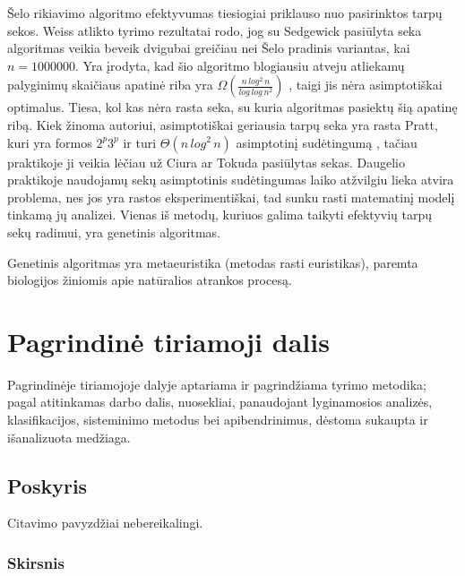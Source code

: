 \documentclass{VUMIFInfKursinis}
\begin{document}
Šelo rikiavimo algoritmo efektyvumas tiesiogiai priklauso nuo pasirinktos tarpų sekos.
Weiss atlikto tyrimo \cite{weiss1991short} rezultatai rodo, jog su Sedgewick pasiūlyta seka
algoritmas veikia beveik dvigubai greičiau nei Šelo pradinis variantas, kai $n = 1000000$.
Yra įrodyta, kad šio algoritmo blogiausiu atveju atliekamų palyginimų skaičiaus apatinė riba yra
$\Omega(\frac{n\,log^2\,n}{log\,log\,n^2})$ \cite{267769}, taigi jis nėra asimptotiškai optimalus.
Tiesa, kol kas nėra rasta seka, su kuria algoritmas pasiektų šią apatinę ribą.
Kiek žinoma autoriui, asimptotiškai geriausia tarpų seka yra rasta Pratt, kuri yra formos
$2^p3^p$ ir turi $\Theta(n\,log^2\,n)$ asimptotinį sudėtingumą \cite{pratt1972shellsort},
tačiau praktikoje ji veikia lėčiau už Ciura \cite{ciura2001best} ar Tokuda \cite{10.5555/645569.659879} pasiūlytas sekas.
Daugelio praktikoje naudojamų sekų asimptotinis sudėtingumas laiko atžvilgiu lieka atvira problema,
nes jos yra rastos eksperimentiškai, tad sunku rasti matematinį modelį tinkamą jų analizei.
Vienas iš metodų, kuriuos galima taikyti efektyvių tarpų sekų radimui, yra genetinis algoritmas.

Genetinis algoritmas yra metaeuristika (metodas rasti euristikas), paremta biologijos žiniomis apie natūralios atrankos procesą.



\section{Pagrindinė tiriamoji dalis}
Pagrindinėje tiriamojoje dalyje aptariama ir pagrindžiama tyrimo metodika;
pagal atitinkamas darbo dalis, nuosekliai, panaudojant lyginamosios analizės,
klasifikacijos, sisteminimo metodus bei apibendrinimus, dėstoma sukaupta ir
išanalizuota medžiaga.

\subsection{Poskyris}
Citavimo pavyzdžiai nebereikalingi.

\subsubsection{Skirsnis}
\end{document}
